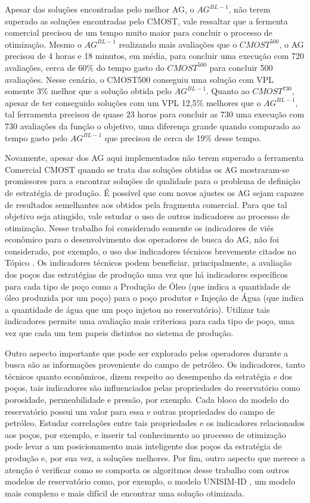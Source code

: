 Apesar das soluções encontradas pelo melhor AG, o $AG^{BL-1}$, não terem superado as soluções encontradas pelo CMOST, vale ressaltar que a fermenta comercial precisou de um tempo muito maior para concluir o processo de otimização. Mesmo o $AG^{BL-1}$ realizando mais avaliações que o $CMOST^{500}$, o AG precisou de 4 horas e 18 minutos, em média, para concluir uma execução com 720 avaliações, cerca de 60\% do tempo gasto do $CMOST^{500}$ para concluir 500 avaliações. Nesse cenário, o CMOST500 conseguiu uma solução com VPL somente 3\% melhor que a solução obtida pelo $AG^{BL-1}$. Quanto ao $CMOST^{730}$, apesar de ter conseguido soluções com um VPL 12,5\% melhores que o $AG^{BL-1}$, tal ferramenta precisou de quase 23 horas para concluir as 730 uma execução com 730 avaliações da função o objetivo, uma diferença grande quando comparado ao tempo gasto pelo $AG^{BL-1}$ que precisou de cerca de 19\% desse tempo.

Novamente, apesar dos AG aqui implementados não terem superado a ferramenta Comercial CMOST quando se trata das soluções obtidas os AG mostraram-se promissores para a encontrar soluções de qualidade para o problema de definição de estratégia de produção. É possível que com novos ajustes os AG sejam capazes de resultados semelhantes aos obtidos pela fragmenta comercial.  Para que tal objetivo seja atingido, vale estudar o uso de outros indicadores ao processo de otimização. Nesse trabalho foi considerado somente os indicadores de viés econômico para o desenvolvimento dos operadores de busca do AG, não foi considerado, por exemplo, o uso dos indicadores técnicos brevemente citados no Tópico . Os indicadores técnicos podem beneficiar, principalmente, a avaliação dos poços das estratégias de produção uma vez que há indicadores específicos para cada tipo de poço como a Produção de Óleo (que indica a quantidade de óleo produzida por um poço) para o poço produtor e Injeção de Água (que indica a quantidade de água que um poço injetou no reservatório). Utilizar tais indicadores permite uma avaliação mais criteriosa para cada tipo de poço, uma vez que cada um tem papeis distintos no sistema de produção. 

Outro aspecto importante que pode ser explorado pelos operadores durante a busca são as informações proveniente do campo de petróleo. Os indicadores, tanto técnicos quanto econômicos, dizem respeito ao desempenho da estratégia e dos poços, tais indicadores são influenciados pelas propriedades do reservatório como porosidade, permeabilidade e pressão, por exemplo. Cada bloco do modelo do reservatório possui um valor para essa e outras propriedades do campo de petróleo. Estudar correlações entre tais propriedades e os indicadores relacionados aos poços, por exemplo, e inserir tal conhecimento ao processo de otimização pode levar a um posicionamento mais inteligente dos poços da estratégia de produção e, por sua vez, a soluções melhores. Por fim, outro aspecto que merece a atenção é verificar como se comporta os algoritmos desse trabalho com outros modelos de reservatório como, por exemplo, o modelo UNISIM-ID \cite{GasparRavagnani2015}, um modelo mais complexo e mais difícil de encontrar uma solução otimizada.
